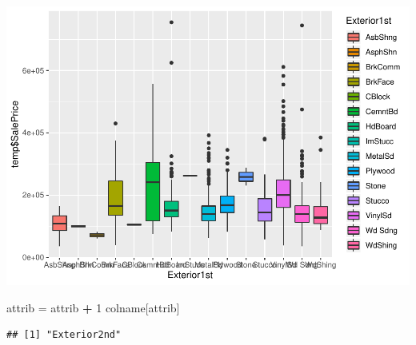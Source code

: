 \documentclass[]{article}
\newenvironment{Shaded}{\begin{snugshade}}{\end{snugshade}}
\newcommand{\DecValTok}[1]{\textcolor[rgb]{0.00,0.00,0.81}{#1}}
\newcommand{\StringTok}[1]{\textcolor[rgb]{0.31,0.60,0.02}{#1}}
\newcommand{\OperatorTok}[1]{\textcolor[rgb]{0.81,0.36,0.00}{\textbf{#1}}}
\newcommand{\NormalTok}[1]{#1}
\begin{document}
\includegraphics{EDA_files/figure-latex/unnamed-chunk-46-1.pdf}

\begin{Shaded}
\begin{Highlighting}[]
\NormalTok{attrib =}\StringTok{ }\NormalTok{attrib }\OperatorTok{+}\StringTok{ }\DecValTok{1}
\NormalTok{colname[attrib]}
\end{Highlighting}
\end{Shaded}

\begin{verbatim}
## [1] "Exterior2nd"
\end{verbatim}
\end{document}
